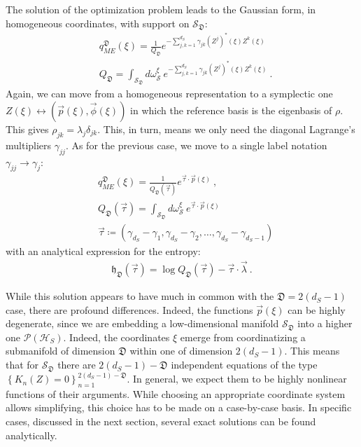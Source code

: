 \documentclass[draft,nofootinbib,pre,twocolumn,showpacs,showkeys,groupaddress,preprintnumbers,floatfix]{revtex4-1}
\newcommand{\1}{\mathbbm{1}}
\newcommand{\ID}{\mathfrak{D}}
\newcommand{\PHS}{\mathcal{P}(\mathcal{H}_S)}
\begin{document}
The solution of the optimization problem leads to the Gaussian form, in homogeneous coordinates, with support on $\mathcal{S}_{\ID}$:
\begin{subequations}
\begin{align*}
&q_{ME}^{\ID}(\xi) = \frac{1}{Q_{\ID}}e^{-\sum_{j,k=1}^{d_S} \gamma_{jk}(Z^{j})^{*}(\xi)Z^k(\xi)}\\
&Q_\ID = \int_{\mathcal{S}_\ID}\!\!\!\! d\omega_{\mathcal{S}}^\xi~e^{-\sum_{j,k=1}^{d_S} \gamma_{jk}(Z^{j})^{*}(\xi)Z^k(\xi)}
  ~.
\end{align*}
\end{subequations}
Again, we can move from a homogeneous representation to a symplectic one $Z(\xi) \leftrightarrow \left(\vec{p}(\xi),\vec{\phi}(\xi)\right)$
in which the reference basis is the eigenbasis of $\rho$. This gives $\rho_{jk}
= \lambda_j \delta_{jk}$. This, in turn, means we only need
the diagonal Lagrange's multipliers $\gamma_{jj}$. As for the previous case, we
move to a single label notation $\gamma_{jj} \to \gamma_{j}$:
\begin{subequations}
\begin{align*}
&q_{ME}^{\ID}(\xi) = \frac{1}{Q_\ID(\vec{\tau})}e^{\vec{\tau} \cdot \vec{p}(\xi)}~,\\ 
& Q_\ID(\vec{\tau}) = \int_{\mathcal{S}_{\ID}}\!\!\!\!\! d\omega_{\mathcal{S}}^{\xi}~e^{\vec{\tau} \cdot \vec{p}(\xi)}\\
& \vec{\tau} \coloneqq \left( \gamma_{d_S}-\gamma_1,\gamma_{d_S}-\gamma_2,\ldots,\gamma_{d_S}-\gamma_{d_S-1}\right)
\end{align*}
\end{subequations}
with an analytical expression for the entropy:
\begin{align*}
\mathfrak{h}_{\ID}(\vec{\tau}) = \log Q_\ID(\vec{\tau}) - \vec{\tau} \cdot \vec{\lambda}
  ~.
\end{align*}

While this solution appears to have much in common with the $\ID = 2(d_S-1)$
case, there are profound differences. Indeed, the functions $\vec{p}(\xi)$ can
be highly degenerate, since we are embedding a low-dimensional manifold
$\mathcal{S}_{\ID}$ into a higher one $\PHS$. Indeed, the coordinates $\xi$
emerge from coordinatizing a submanifold of dimension $\ID$ within one of
dimension $2(d_S-1)$. This means that for $\mathcal{S}_{\ID}$ there are
$2(d_S-1)-\ID$ independent equations of the type
$\left\{K_n(Z)=0\right\}_{n=1}^{2(d_S-1)-\ID}$. In general, we expect them to
be highly nonlinear functions of their arguments. While choosing an appropriate
coordinate system allows simplifying, this choice has to be made on a
case-by-case basis. In specific cases, discussed in the next section, several
exact solutions can be found analytically.
\end{document}
